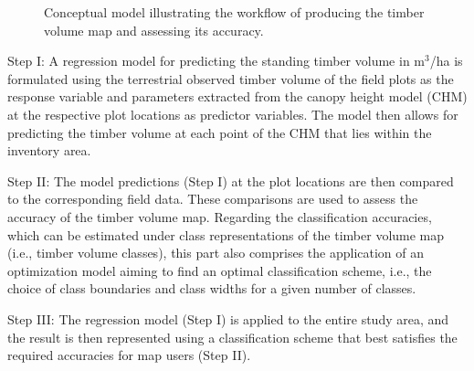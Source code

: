\begin{figure}[H]
	\centering
	\caption{Conceptual model illustrating the workflow of producing the timber volume map and assessing its accuracy.}
	\label{fig:concept}
\end{figure}

Step I: A regression model for predicting the standing timber volume in m$^3$/ha is formulated using the terrestrial observed timber volume of the field plots as the response variable and parameters extracted from the canopy height model (CHM) at the respective plot locations as predictor variables. The model then allows for predicting the timber volume at each point of the CHM that lies within the inventory area.\par
Step II: The model predictions (Step I) at the plot locations are then compared to the corresponding field data. These comparisons are used to assess the accuracy of the timber volume map. Regarding the classification accuracies, which can be estimated under class representations of the timber volume map (i.e., timber volume classes), this part also comprises the application of an optimization model aiming to find an optimal classification scheme, i.e., the choice of class boundaries and class widths for a given number of classes.\par
Step III: The regression model (Step I) is applied to the entire study area, and the result is then represented using a classification scheme that best satisfies the required accuracies for map users (Step II).


